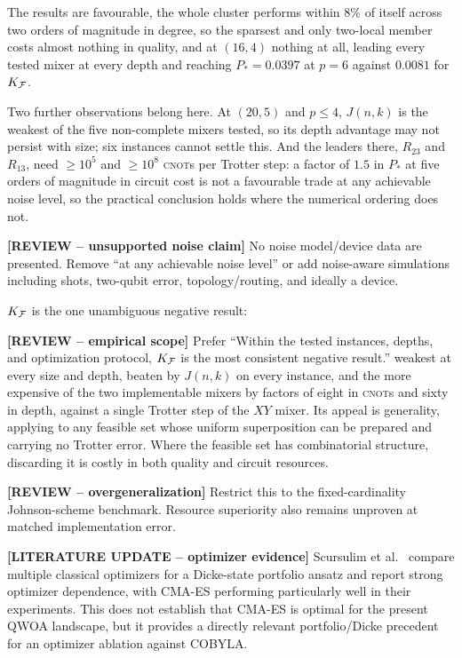 The results are favourable, the whole cluster performs within $8\%$ of itself across two
orders of magnitude in degree, so the sparsest and only two-local member
costs almost nothing in quality, and at $(16,4)$ nothing at all, leading
every tested mixer at every depth and reaching $P_*=0.0397$ at $p=6$
against $0.0081$ for $K_{\mathcal{F}}$.

Two further observations belong here. At $(20,5)$ and $p\le4$, $J(n,k)$ is the weakest of
the five non-complete mixers tested, so its depth advantage may not
persist with size; six instances cannot settle this. And the leaders
there, $R_{23}$ and $R_{13}$, need $\ge10^{5}$ and $\ge10^{8}$
\textsc{cnot}s per Trotter step: a factor of $1.5$ in $P_*$ at five
orders of magnitude in circuit cost is not a favourable trade at any
achievable noise level, so the practical conclusion holds where the
numerical ordering does not.

{\color{red}\textbf{[REVIEW -- unsupported noise claim]} No noise model/device data are presented. Remove ``at any achievable noise level'' or add noise-aware simulations including shots, two-qubit error, topology/routing, and ideally a device.}

$K_{\mathcal{F}}$ is the one unambiguous negative result:

{\color{red}\textbf{[REVIEW -- empirical scope]} Prefer ``Within the tested instances, depths, and optimization protocol, $K_{\mathcal{F}}$ is the most consistent negative result.''} weakest at every size
and depth, beaten by $J(n,k)$ on every instance, and the more expensive
of the two implementable mixers by factors of eight in \textsc{cnot}s and
sixty in depth, against a single Trotter step of the $XY$ mixer. Its
appeal is generality, applying to any feasible set
whose uniform superposition can be prepared and carrying no Trotter
error. Where the feasible set has combinatorial structure, discarding it
is costly in both quality and circuit resources.

{\color{red}\textbf{[REVIEW -- overgeneralization]} Restrict this to the fixed-cardinality Johnson-scheme benchmark. Resource superiority also remains unproven at matched implementation error.}

{\color{red}\textbf{[LITERATURE UPDATE -- optimizer evidence]} Scursulim et al.~\cite{Scursulim2026} compare multiple classical optimizers for a Dicke-state portfolio ansatz and report strong optimizer dependence, with CMA-ES performing particularly well in their experiments. This does not establish that CMA-ES is optimal for the present QWOA landscape, but it provides a directly relevant portfolio/Dicke precedent for an optimizer ablation against COBYLA.}
